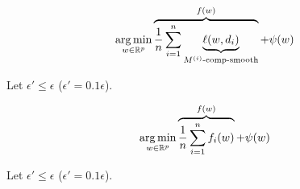 \documentclass{beamer}
\begin{document}
\begin{frame}
  \vspace{-1em}
  \begin{align*}
    & \operatorname*{arg\,min}_{w \in \mathbb R^p} \overbrace{\frac 1n \sum_{i=1}^n
      \underbrace{\ell(w, d_i)}_{M^{(i)}\text{-comp-smooth}}}^{f(w)} + \psi(w)
  \end{align*}

  \vspace{0.5em}

  Let $\epsilon' \le \epsilon$ (\eg $\epsilon' = 0.1 \epsilon$).

\end{frame}

\begin{frame}
  \vspace{1em}
    \begin{minipage}{1.0\linewidth}
      \begin{align*}
        & \operatorname*{arg\,min}_{w \in \mathbb R^p} \overbrace{\frac 1n \sum_{i=1}^n
          f_i(w)}^{f(w)} + \psi(w)
      \end{align*}
    \end{minipage}

  \vspace{0.5em}

  Let $\epsilon' \le \epsilon$ (\eg $\epsilon' = 0.1 \epsilon$).

\end{frame}
\end{document}

